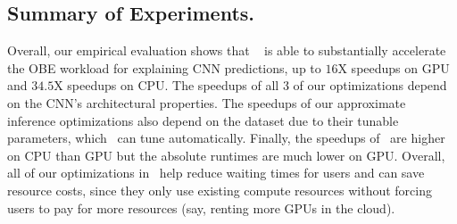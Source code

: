 

\vspace{-2mm}
\subsection{Summary of Experiments.}
Overall, our empirical evaluation shows that \system~ is able to substantially accelerate the OBE workload for explaining CNN predictions, up to $16$X speedups on GPU and $34.5$X speedups on CPU. The speedups of all 3 of our optimizations depend on the CNN's architectural properties. The speedups of our approximate inference optimizations also depend on the dataset due to their tunable parameters, which \system ~can tune automatically. Finally, the speedups of \system ~are higher on CPU than GPU but the absolute runtimes are much lower on GPU. Overall, all of our optimizations in \system ~help reduce waiting times for users and can save resource costs, since they only use existing compute resources without forcing users to pay for more resources (say, renting more GPUs in the cloud).